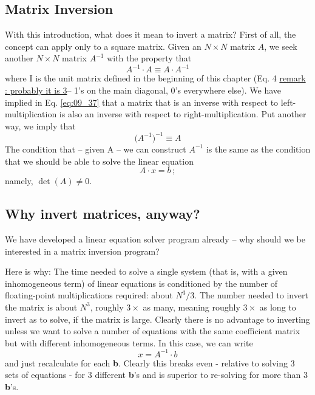 \subsection{Matrix Inversion}
With this introduction, what does it mean to invert a matrix? First
of all, the concept can apply only to a square matrix. Given an
$N \times N$ matrix $A$, we seek another $N \times N$ matrix $A^{-1}$ with the property that
\begin{equation}
    \label{eq:09_37}
    A^{-1} \cdot A \equiv A \cdot A^{-1}
\end{equation} 
where I is the unit matrix defined in the beginning of this chapter
(Eq. 4  \underline{remark : probably it is 3}-- 1's on the main diagonal, 0's everywhere else). We have
implied in Eq. \ref{eq:09_37} that a matrix that is an inverse with respect to
left-multiplication is also an inverse with respect to right-multiplication. Put another way, we imply that
\begin{equation}
    \label{eq:09_38}
    \Big(A^{-1} \Big)^{-1} \equiv A
\end{equation} 
The condition that -- given A -- we can construct $A^{-1}$ is the same
as the condition that we should be able to solve the linear equation
\begin{equation*}
    A \cdot x = b \,;
\end{equation*} 
 namely, $\det(A) \neq 0$.

\subsection{Why invert matrices, anyway?}

We have developed a linear equation solver program already
-- why should we be interested in a matrix inversion program?

Here is why: The time needed to solve a single system (that is,
with a given inhomogeneous term) of linear equations is conditioned by the number of floating-point multiplications required:
about $N^3/3$. The number needed to invert the matrix is about $N^3$,
roughly $3\times$ as many, meaning roughly $3\times$ as long to invert as to
solve, if the matrix is large. Clearly there is no advantage to
inverting unless we want to solve a number of equations with the
same coefficient matrix but with different inhomogeneous terms.
In this case, we can write
\begin{equation}
    \label{eq:09_39}
    x = A^{-1} \cdot b
\end{equation} 
and just recalculate for each \textbf{b}. Clearly this breaks even - relative
to solving 3 sets of equations - for 3 different \textbf{b}'s and is superior
to re-solving for more than 3 \textbf{b}'s.

